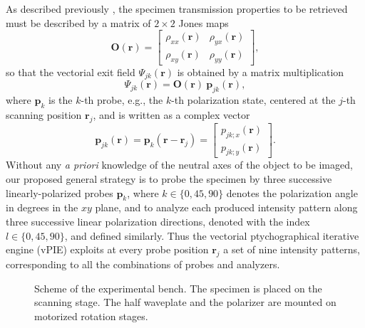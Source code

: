 \documentclass[aps,prl,twocolumn,amsmath]{revtex4-1}
\newcommand{\rb}{\mathbf{r}}
\newcommand{\pb}{\mathbf{p}}
\newcommand{\Ob}{\mathbf{O}}
\begin{document}

As described previously \cite{Ferrand15}, the specimen transmission properties to be retrieved must be described by a matrix of $2\times2$ Jones maps
\begin{equation}
  \Ob (\rb) = 
  \left[
    \begin{array}{cc}
      \rho_{xx}(\rb) & \rho_{yx}(\rb) \\
      \rho_{xy}(\rb) & \rho_{yy}(\rb) 
    \end{array}
  \right],
\end{equation}
so that the vectorial exit field $\Psi_{jk}(\rb)$ is obtained by a matrix multiplication
\begin{equation}
\Psi_{jk}(\rb) = \Ob(\rb) \ \pb_{jk}(\rb),
\label{eq:matrixmultip}
\end{equation}
where $\pb_{k}$ is the $k$-th probe, e.g., the $k$-th polarization state, centered at the $j$-th scanning position $\rb_j$, and is written as a complex vector
\begin{equation}
   \pb_{jk}(\rb) = \pb_{k}(\rb-\rb_j) =
     \left[
     \begin{array}{c}
       p_{jk;x}(\rb) \\
      p_{jk;y}(\rb) 
     \end{array}
   \right].
\end{equation}
Without any \emph{a priori} knowledge of the neutral axes of the object to be imaged, our proposed general strategy is to probe the specimen by three successive linearly-polarized probes $\pb_{k}$, where $k \in \{0,45,90\}$ denotes the polarization angle in degrees in the $xy$ plane, and to analyze each produced intensity pattern along three successive linear polarization directions, denoted with the index $l \in \{0, 45, 90\}$, and defined similarly. Thus the vectorial ptychographical iterative engine (vPIE) exploits at every probe position $\rb_j$ a set of nine intensity patterns, corresponding to all the combinations of probes and analyzers.

\begin{figure}[!h]
\centering
{}
\caption{Scheme of the experimental bench. The specimen is placed on the scanning stage. The half waveplate and the polarizer are mounted on motorized rotation stages.}
\label{fig:Fig01}
\end{figure}
\end{document}
